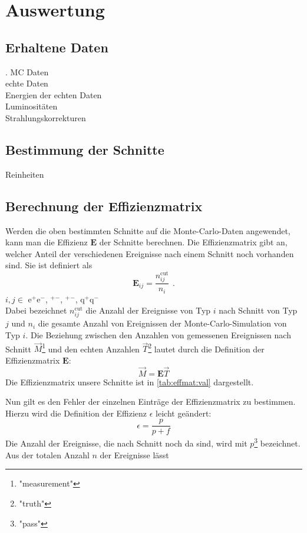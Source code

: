 \section{Auswertung}
\subsection{Erhaltene Daten}.
MC Daten \\
echte Daten \\
Energien der echten Daten \\
Luminositäten \\
Strahlungskorrekturen 
\subsection{Bestimmung der Schnitte}
Reinheiten
\subsection{Berechnung der Effizienzmatrix}
Werden die oben bestimmten Schnitte auf die Monte-Carlo-Daten angewendet, kann man die Effizienz $\bm{E}$ der Schnitte berechnen. 
Die Effizienzmatrix gibt an, welcher Anteil der verschiedenen Ereignisse nach einem Schnitt noch vorhanden sind. Sie ist definiert als 
\begin{equation}
    \bm{E}_{ij} = \frac{n_{ij}^\text{cut}}{n_i} \ \, .
\end{equation} 
$i, j \in $ e$^+$e$^-$, \textmu$^+$\textmu$^-$, \texttau$^+$\texttau$^-$, q$^+$q$^-$ \\  %
Dabei bezeichnet $n_{ij}^\text{cut}$ die Anzahl der Ereignisse von Typ $i$ nach Schnitt von Typ $j$ und $n_i$ die gesamte Anzahl von Ereignissen 
der Monte-Carlo-Simulation von Typ $i$. 
Die Beziehung zwischen den Anzahlen von gemessenen Ereignissen nach Schnitt $\vec{M}$\footnote{"measurement"} und den echten Anzahlen 
$\vec{T}$\footnote{"truth"} lautet durch die Definition der Effizienzmatrix $\bm{E}$:
\begin{equation}
    \label{eq:effmat:mtrel}
    \vec{M} = \bm{E} \vec{T}
\end{equation}
Die Effizienzmatrix unsere Schnitte ist in \autoref{tab:effmat:val} dargestellt.

Nun gilt es den Fehler der einzelnen Einträge der Effizienzmatrix zu bestimmen. Hierzu wird die Definition der Effizienz $\epsilon$ leicht geändert:
\begin{equation}
    \epsilon = \frac{p}{p+f}	
\end{equation}
Die Anzahl der Ereignisse, die nach Schnitt noch da sind, wird mit $p$\footnote{"pass"} bezeichnet. Aus der totalen Anzahl $n$ der Ereignisse lässt 
